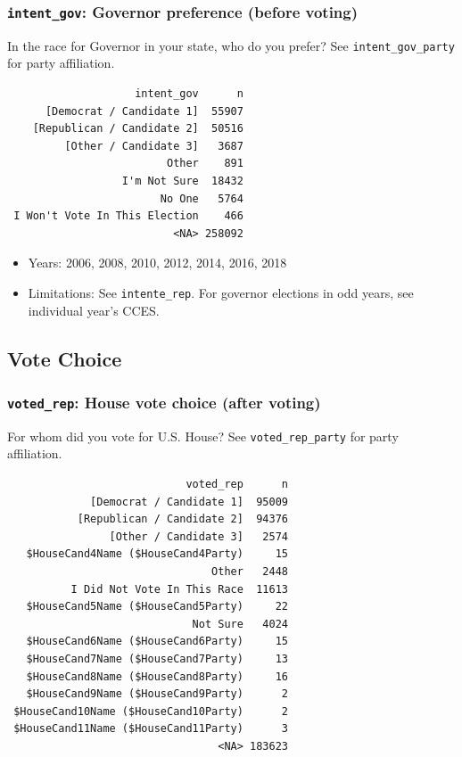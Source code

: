 \documentclass[10pt,article,oneside]{memoir}
\theoremstyle{definition}
\begin{document}
\hypertarget{intent_gov-governor-preference-before-voting}{%
\subsubsection{\texorpdfstring{\texttt{intent\_gov}: Governor preference
(before
voting)}{intent\_gov: Governor preference (before voting)}}\label{intent_gov-governor-preference-before-voting}}

In the race for Governor in your state, who do you prefer? See
\texttt{intent\_gov\_party} for party affiliation.

\begin{verbatim}
                    intent_gov      n
      [Democrat / Candidate 1]  55907
    [Republican / Candidate 2]  50516
         [Other / Candidate 3]   3687
                         Other    891
                  I'm Not Sure  18432
                        No One   5764
 I Won't Vote In This Election    466
                          <NA> 258092
\end{verbatim}

\begin{itemize}
\tightlist
\item
  Years: 2006, 2008, 2010, 2012, 2014, 2016, 2018
\item
  Limitations: See \texttt{intente\_rep}. For governor elections in odd
  years, see individual year's CCES.
\end{itemize}

\hypertarget{vote-choice}{%
\subsection{Vote Choice}\label{vote-choice}}

\hypertarget{voted_rep-house-vote-choice-after-voting}{%
\subsubsection{\texorpdfstring{\texttt{voted\_rep}: House vote choice
(after
voting)}{voted\_rep: House vote choice (after voting)}}\label{voted_rep-house-vote-choice-after-voting}}

For whom did you vote for U.S. House? See \texttt{voted\_rep\_party} for
party affiliation.

\begin{verbatim}
                            voted_rep      n
             [Democrat / Candidate 1]  95009
           [Republican / Candidate 2]  94376
                [Other / Candidate 3]   2574
   $HouseCand4Name ($HouseCand4Party)     15
                                Other   2448
          I Did Not Vote In This Race  11613
   $HouseCand5Name ($HouseCand5Party)     22
                             Not Sure   4024
   $HouseCand6Name ($HouseCand6Party)     15
   $HouseCand7Name ($HouseCand7Party)     13
   $HouseCand8Name ($HouseCand8Party)     16
   $HouseCand9Name ($HouseCand9Party)      2
 $HouseCand10Name ($HouseCand10Party)      2
 $HouseCand11Name ($HouseCand11Party)      3
                                 <NA> 183623
\end{verbatim}
\end{document}
